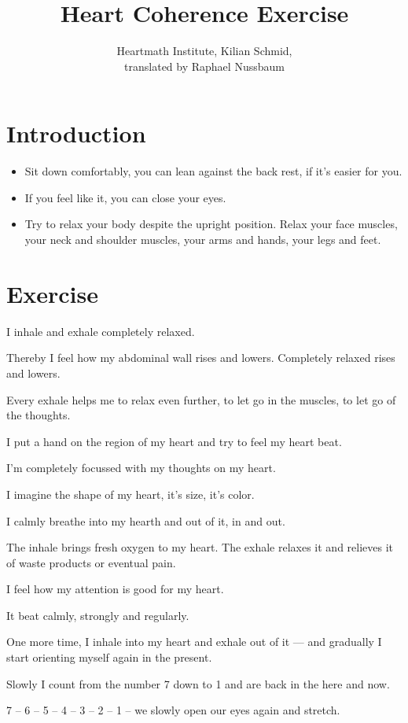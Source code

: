 \documentclass[12pt]{article}
\title{Heart Coherence Exercise}
\author{Heartmath Institute, Kilian Schmid, \\translated by Raphael Nussbaum}
\date{}
\begin{document}
\maketitle
\section{Introduction}
\begin{itemize}
\item Sit down comfortably, you can lean against the back rest, if it's easier for you. 
\item If you feel like it, you can close your eyes.
\item Try to relax your body despite the upright position. Relax your face muscles, your neck and shoulder muscles, your arms and hands, your legs and feet.
\end{itemize}
\section{Exercise}
I inhale and exhale completely relaxed. 

Thereby I feel how my abdominal wall rises and lowers. Completely relaxed rises and lowers.

\vspace{6mm}
Every exhale helps me to relax even further, to let go in the muscles, to let go of the thoughts.

\vspace{6mm}
I put a hand on the region of my heart and try to feel my heart beat.

\vspace{6mm}
I'm completely focussed with my thoughts on my heart.

\vspace{6mm}
I imagine the shape of my heart, it's size, it's color.

\vspace{6mm}
I calmly breathe into my hearth and out of it, in and out.

\vspace{6mm}
The inhale brings fresh oxygen to my heart. The exhale relaxes it and relieves it of waste products or eventual pain.

\vspace{6mm}
I feel how my attention is good for my heart.

\vspace{6mm}
It beat calmly, strongly and regularly.

\vspace{6mm}
One more time, I inhale into my heart and exhale out of it --- and gradually I start orienting myself again in the present.

\vspace{10mm}
Slowly I count from the number 7 down to 1 and are back in the here and now.

7 -- 6 -- 5 -- 4 -- 3 -- 2 -- 1 -- we slowly open our eyes again and stretch.
\end{document}
